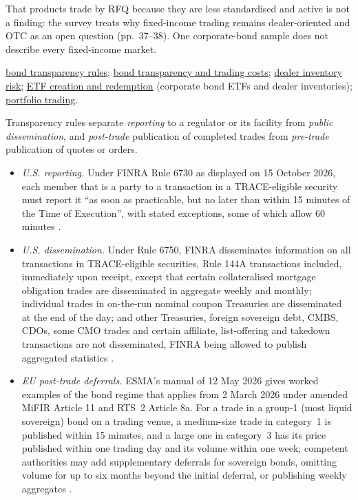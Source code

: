 \begin{qfdefinition}
That products trade by RFQ because they are less standardised and active is not a finding: the survey treats why fixed-income trading remains dealer-oriented and OTC as an open question (pp.~37--38). One corporate-bond sample does not describe every fixed-income market.

 \hyperref[rule:us-eu-bond-transparency]{bond transparency rules}; \hyperref[ev:bond-transparency-trading-costs]{bond transparency and trading costs}; \hyperref[def:dealer-inventory-risk]{dealer inventory risk}; \hyperref[mech:etf-creation-redemption]{ETF creation and redemption} (corporate bond ETFs and dealer inventories); \hyperref[def:portfolio-trading]{portfolio trading}.

\end{qfdefinition}

\begin{qfrule}\label{rule:us-eu-bond-transparency}
 Transparency rules separate \emph{reporting} to a regulator or its facility from \emph{public dissemination}, and \emph{post-trade} publication of completed trades from \emph{pre-trade} publication of quotes or orders.
\begin{itemize}
\item \emph{U.S. reporting.} Under FINRA Rule 6730 as displayed on 15 October 2026, each member that is a party to a transaction in a TRACE-eligible security must report it ``as soon as practicable, but no later than within 15 minutes of the Time of Execution'', with stated exceptions, some of which allow 60 minutes \citep[Rule 6730(a)]{finra-rule-6730}.
\item \emph{U.S. dissemination.} Under Rule 6750, FINRA disseminates information on all transactions in TRACE-eligible securities, Rule 144A transactions included, immediately upon receipt, except that certain collateralised mortgage obligation trades are disseminated in aggregate weekly and monthly; individual trades in on-the-run nominal coupon Treasuries are disseminated at the end of the day; and other Treasuries, foreign sovereign debt, CMBS, CDOs, some CMO trades and certain affiliate, list-offering and takedown transactions are not disseminated, FINRA being allowed to publish aggregated statistics \citep[Rule 6750(a)--(d) and .01]{finra-rule-6750}.
\item \emph{EU post-trade deferrals.} ESMA's manual of 12 May 2026 gives worked examples of the bond regime that applies from 2 March 2026 under amended MiFIR Article 11 and RTS~2 Article 8a. For a trade in a group-1 (most liquid sovereign) bond on a trading venue, a medium-size trade in category~1 is published within 15 minutes, and a large one in category~3 has its price published within one trading day and its volume within one week; competent authorities may add supplementary deferrals for sovereign bonds, omitting volume for up to six months beyond the initial deferral, or publishing weekly aggregates \citep[secs.~4.2.8 and~4.2.8.2, pp.~262--272]{esma-transparency-manual-2026}.

\end{itemize}
\end{qfrule}

